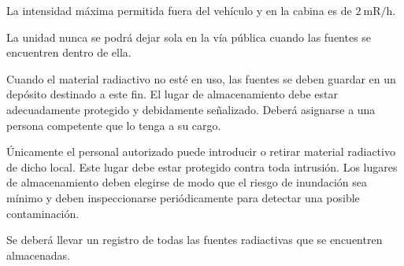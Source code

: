 La intensidad máxima permitida fuera del vehículo y en la cabina es de $2\ \mathrm{mR/h}$.

La unidad nunca se podrá dejar sola en la vía pública cuando las fuentes se encuentren dentro de ella.

Cuando el material radiactivo no esté en uso, las fuentes se deben guardar en un depósito destinado a este fin. El lugar de almacenamiento debe estar adecuadamente protegido y debidamente señalizado. Deberá asignarse a una persona competente que lo tenga a su cargo.

Únicamente el personal autorizado puede introducir o retirar material radiactivo de dicho local. Este lugar debe estar protegido contra toda intrusión. Los lugares de almacenamiento deben elegirse de modo que el riesgo de inundación sea mínimo y deben inspeccionarse periódicamente para detectar una posible contaminación.

Se deberá llevar un registro de todas las fuentes radiactivas que se encuentren almacenadas.

